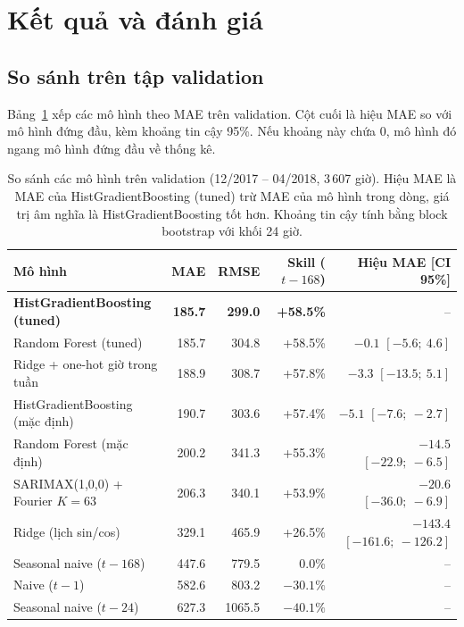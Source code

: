 \section{Kết quả và đánh giá}
\label{sec:ts-results}

\subsection{So sánh trên tập validation}
\label{sec:ts-val}
Bảng~\ref{tab:ts-val} xếp các mô hình theo MAE trên validation. Cột cuối là hiệu MAE so với mô hình đứng đầu, kèm khoảng tin cậy 95\%. Nếu
khoảng này chứa 0, mô hình đó ngang mô hình đứng đầu về thống kê.

\begin{table}[H]
\centering
\caption{So sánh các mô hình trên validation (12/2017 -- 04/2018, 3\,607 giờ). Hiệu MAE là MAE của HistGradientBoosting (tuned) trừ MAE của mô hình trong dòng, giá trị âm nghĩa là HistGradientBoosting tốt hơn. Khoảng tin cậy tính bằng block bootstrap với khối 24 giờ.}
\label{tab:ts-val}
\small\setlength{\tabcolsep}{4pt}
\begin{tabular}{lrrrr}
\toprule
Mô hình & MAE & RMSE & Skill ($t-168$) & Hiệu MAE [CI 95\%]\\
\midrule
\textbf{HistGradientBoosting (tuned)} & \textbf{185.7} & \textbf{299.0} & \textbf{+58.5\%} & --\\
Random Forest (tuned) & 185.7 & 304.8 & +58.5\% & $-0.1$ $[-5.6;\ 4.6]$\\
Ridge + one-hot giờ trong tuần & 188.9 & 308.7 & +57.8\% & $-3.3$ $[-13.5;\ 5.1]$\\
HistGradientBoosting (mặc định) & 190.7 & 303.6 & +57.4\% & $-5.1$ $[-7.6;\ -2.7]$\\
Random Forest (mặc định) & 200.2 & 341.3 & +55.3\% & $-14.5$ $[-22.9;\ -6.5]$\\
SARIMAX(1,0,0) + Fourier $K = 63$ & 206.3 & 340.1 & +53.9\% & $-20.6$ $[-36.0;\ -6.9]$\\
Ridge (lịch sin/cos) & 329.1 & 465.9 & +26.5\% & $-143.4$ $[-161.6;\ -126.2]$\\
Seasonal naive ($t-168$) & 447.6 & 779.5 & 0.0\% & --\\
Naive ($t-1$) & 582.6 & 803.2 & $-30.1\%$ & --\\
Seasonal naive ($t-24$) & 627.3 & 1065.5 & $-40.1\%$ & --\\
\bottomrule
\end{tabular}
\end{table}

